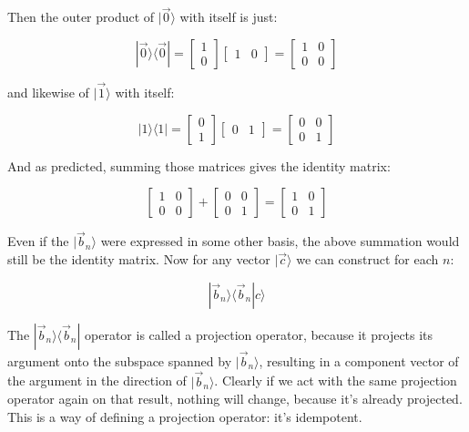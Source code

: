 Then the outer product of $|\vec{0} \rangle$ with itself is just:

$$
|\vec{0} \rangle \langle \vec{0}| = 
\begin{bmatrix} 1 \\ 0 \end{bmatrix}
\begin{bmatrix} 1 & 0 \end{bmatrix} =
\begin{bmatrix} 1 & 0 \\ 0 & 0 \end{bmatrix}
$$

and likewise of $|\vec{1} \rangle$ with itself:

$$
|1 \rangle \langle 1| = 
\begin{bmatrix} 0 \\ 1 \end{bmatrix}
\begin{bmatrix} 0 & 1 \end{bmatrix} =
\begin{bmatrix} 0 & 0 \\ 0 & 1 \end{bmatrix}
$$

And as predicted, summing those matrices gives the identity matrix:

$$
\begin{bmatrix} 1 & 0 \\ 0 & 0 \end{bmatrix} +
\begin{bmatrix} 0 & 0 \\ 0 & 1 \end{bmatrix} =
\begin{bmatrix} 1 & 0 \\ 0 & 1 \end{bmatrix}
$$

Even if the $|\vec{b}_n \rangle$ were expressed in some other basis, the above summation would still be the identity matrix. Now for any vector $|\vec{c} \rangle$ we can construct for each $n$:

$$|\vec{b}_n \rangle \langle \vec{b}_n | c \rangle$$

The $|\vec{b}_n \rangle \langle \vec{b}_n|$ operator is called a projection operator, because it projects its argument onto the subspace spanned by $|\vec{b}_n \rangle$, resulting in a component vector of the argument in the direction of $|\vec{b}_n \rangle$. Clearly if we act with the same projection operator again on that result, nothing will change, because it's already projected. This is a way of defining a projection operator: it's idempotent.

